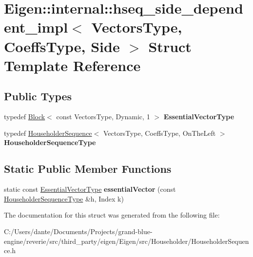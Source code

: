 \hypertarget{struct_eigen_1_1internal_1_1hseq__side__dependent__impl}{}\section{Eigen\+::internal\+::hseq\+\_\+side\+\_\+dependent\+\_\+impl$<$ Vectors\+Type, Coeffs\+Type, Side $>$ Struct Template Reference}
\label{struct_eigen_1_1internal_1_1hseq__side__dependent__impl}
\subsection*{Public Types}
\begin{DoxyCompactItemize}
\item 
\mbox{\label{struct_eigen_1_1internal_1_1hseq__side__dependent__impl_a51185d5e14356717e56f76af9242c8d0}} 
typedef \mbox{\hyperlink{class_eigen_1_1_block}{Block}}$<$ const Vectors\+Type, Dynamic, 1 $>$ {\bfseries Essential\+Vector\+Type}
\item 
\mbox{\label{struct_eigen_1_1internal_1_1hseq__side__dependent__impl_a17ce37940408090919613afeaa81617a}} 
typedef \mbox{\hyperlink{class_eigen_1_1_householder_sequence}{Householder\+Sequence}}$<$ Vectors\+Type, Coeffs\+Type, On\+The\+Left $>$ {\bfseries Householder\+Sequence\+Type}
\end{DoxyCompactItemize}
\subsection*{Static Public Member Functions}
\begin{DoxyCompactItemize}
\item 
\mbox{\label{struct_eigen_1_1internal_1_1hseq__side__dependent__impl_ad783e05cccf4f436e44769df2bb199af}} 
static const \mbox{\hyperlink{class_eigen_1_1_block}{Essential\+Vector\+Type}} {\bfseries essential\+Vector} (const \mbox{\hyperlink{class_eigen_1_1_householder_sequence}{Householder\+Sequence\+Type}} \&h, Index k)
\end{DoxyCompactItemize}


The documentation for this struct was generated from the following file\+:\begin{DoxyCompactItemize}
\item 
C\+:/\+Users/dante/\+Documents/\+Projects/grand-\/blue-\/engine/reverie/src/third\+\_\+party/eigen/\+Eigen/src/\+Householder/Householder\+Sequence.\+h\end{DoxyCompactItemize}
